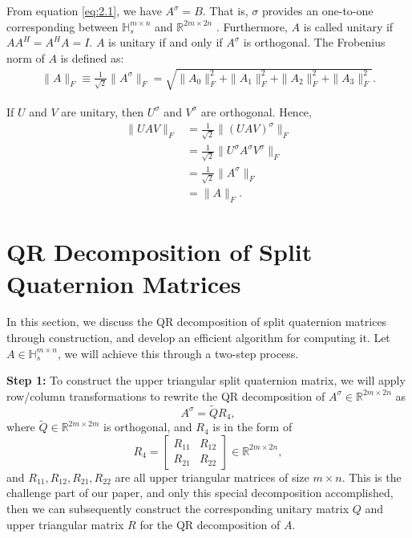 \documentclass[conference]{IEEEtran}
\numberwithin{equation}{section}
\begin{document}
From equation \eqref{eq:2.1}, we have ${A}^\sigma = B$. 
That is, $\sigma$ provides an one-to-one corresponding between $\mathbb{H}_s^{m\times n}$ and $\mathbb{R}^{2m \times 2n}$ \cite{Gang2024}. Furthermore, $A$ is called unitary if $AA^H = A^H A = I$. $A$ is unitary if and only if $A^\sigma$ is orthogonal.
 The Frobenius norm of $A$ is defined as: 
 \begin{align*}
     \| A \|_F \equiv \frac{1}{\sqrt{2}} \| A^\sigma \|_F = \sqrt{\| A_0 \|_F^2 + \| A_1 \|_F^2 + \| A_2 \|_F^2 + \| A_3 \|_F^2}.
\end{align*}

If $U$ and $ V$ are unitary, then $U^\sigma$ and $V^\sigma$ are orthogonal.  Hence,
\begin{align*}
\|UAV\|_F &= \frac{1}{\sqrt{2}} \|(UAV)^\sigma\|_F \\
        &= \frac{1}{\sqrt{2}} \|U^\sigma A^\sigma V^\sigma\|_F \\
        &= \frac{1}{\sqrt{2}} \|A^\sigma\|_F \\
        &= \|A\|_F.
\end{align*}

\section{QR Decomposition of Split Quaternion Matrices}
In this section, we discuss the QR decomposition of split quaternion matrices through construction, and develop an efficient algorithm for computing it. Let $A \in \mathbb{H}_s^{m \times n}$, we will achieve this through a two-step process.

\noindent \textbf{Step 1:} To construct the upper triangular split quaternion matrix, we will apply row/column transformations to rewrite the QR decomposition of $A^\sigma \in \mathbb{R}^{2m \times 2n}$ as 
\begin{equation}\label{splitqr}
A^\sigma = \widetilde{Q} R_4,
\end{equation} 
where $\widetilde{Q} \in \mathbb{R}^{2m\times 2m}$ is orthogonal, and $R_4$ is in the form of 
\begin{equation}\label{r4}
R_4 = \begin{bmatrix}
    R_{11} & R_{12} \\
    R_{21} & R_{22}
\end{bmatrix} \in \mathbb{R}^{2m \times 2n},
\end{equation}
and $R_{11}, R_{12},R_{21},R_{22}$ are all upper triangular matrices of size $m \times n$. This is the challenge part of our paper, and only this special decomposition accomplished, then we can subsequently construct the corresponding unitary matrix \(Q\) and upper triangular matrix \(R\) for the QR decomposition of \(A\).
\end{document}
